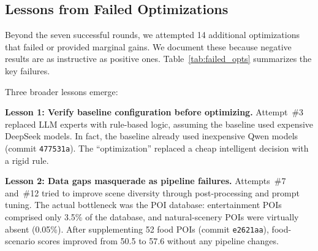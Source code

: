 \subsection{Lessons from Failed Optimizations}

Beyond the seven successful rounds, we attempted 14 additional optimizations that failed or provided marginal gains. We document these because negative results are as instructive as positive ones. Table~\ref{tab:failed_opts} summarizes the key failures.

\begin{table}[!t]
\centering
\caption{Failed or marginal optimization attempts. Data from optimization log (commit \texttt{d323625}).}
\label{tab:failed_opts}
\end{table}

Three broader lessons emerge:

\textbf{Lesson 1: Verify baseline configuration before optimizing.} Attempt~\#3 replaced LLM experts with rule-based logic, assuming the baseline used expensive DeepSeek models. In fact, the baseline already used inexpensive Qwen models (commit \texttt{477531a}). The ``optimization'' replaced a cheap intelligent decision with a rigid rule.

\textbf{Lesson 2: Data gaps masquerade as pipeline failures.} Attempts~\#7 and~\#12 tried to improve scene diversity through post-processing and prompt tuning. The actual bottleneck was the POI database: entertainment POIs comprised only 3.5\% of the database, and natural-scenery POIs were virtually absent (0.05\%). After supplementing 52 food POIs (commit \texttt{e2621aa}), food-scenario scores improved from 50.5 to 57.6 without any pipeline changes.

